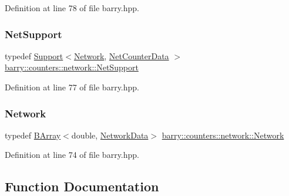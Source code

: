 Definition at line 78 of file barry.\+hpp.

\mbox{\label{namespacebarry_1_1counters_1_1network_a4d30be7f465efd7d218f0264f8386b32}} 
\subsubsection{\texorpdfstring{Net\+Support}{NetSupport}}
{\footnotesize\ttfamily typedef \hyperlink{classbarry_1_1_support}{Support}$<$\hyperlink{namespacebarry_1_1counters_1_1network_a440182967e1ba465e90a4b1d07e3a366}{Network}, \hyperlink{classbarry_1_1counters_1_1network_1_1_net_counter_data}{Net\+Counter\+Data} $>$ \hyperlink{namespacebarry_1_1counters_1_1network_a4d30be7f465efd7d218f0264f8386b32}{barry\+::counters\+::network\+::\+Net\+Support}}



Definition at line 77 of file barry.\+hpp.

\mbox{\label{namespacebarry_1_1counters_1_1network_a440182967e1ba465e90a4b1d07e3a366}} 
\subsubsection{\texorpdfstring{Network}{Network}}
{\footnotesize\ttfamily typedef \hyperlink{classbarry_1_1_b_array}{B\+Array}$<$double, \hyperlink{classbarry_1_1counters_1_1network_1_1_network_data}{Network\+Data}$>$ \hyperlink{namespacebarry_1_1counters_1_1network_a440182967e1ba465e90a4b1d07e3a366}{barry\+::counters\+::network\+::\+Network}}



Definition at line 74 of file barry.\+hpp.



\subsection{Function Documentation}
\mbox{\label{namespacebarry_1_1counters_1_1network_a0150bbe24de4218a40c0880e55c73e9e}} 
